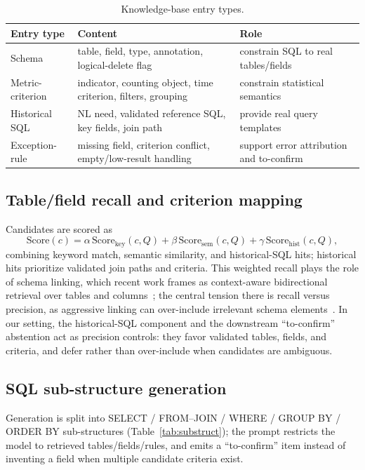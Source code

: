 \documentclass[11pt]{article}
\begin{document}
\begin{table}[t]\centering
\caption{Knowledge-base entry types.}\label{tab:kb}
\begin{tabular}{p{3.1cm}p{6.1cm}p{4.4cm}}
\toprule
Entry type & Content & Role\\
\midrule
Schema & table, field, type, annotation, logical-delete flag & constrain SQL to real tables/fields\\
Metric-criterion & indicator, counting object, time criterion, filters, grouping & constrain statistical semantics\\
Historical SQL & NL need, validated reference SQL, key fields, join path & provide real query templates\\
Exception-rule & missing field, criterion conflict, empty/low-result handling & support error attribution and to-confirm\\
\bottomrule
\end{tabular}
\end{table}

\subsection{Table/field recall and criterion mapping}
Candidates are scored as
\begin{equation}
\text{Score}(c)=\alpha\,\text{Score}_{\text{key}}(c,Q)+\beta\,\text{Score}_{\text{sem}}(c,Q)
+\gamma\,\text{Score}_{\text{hist}}(c,Q),
\end{equation}
combining keyword match, semantic similarity, and historical-SQL hits; historical hits prioritize
validated join paths and criteria. This weighted recall plays the role of schema linking, which
recent work frames as context-aware bidirectional retrieval over tables and
columns~\cite{schemalink2025}; the central tension there is recall versus precision, as aggressive
linking can over-include irrelevant schema elements~\cite{rslsql2024}. In our setting, the
historical-SQL component and the downstream ``to-confirm'' abstention act as precision controls:
they favor validated tables, fields, and criteria, and defer rather than over-include when
candidates are ambiguous.

\subsection{SQL sub-structure generation}
Generation is split into SELECT / FROM--JOIN / WHERE / GROUP BY / ORDER BY sub-structures
(Table~\ref{tab:substruct}); the prompt restricts the model to retrieved tables/fields/rules, and
emits a ``to-confirm'' item instead of inventing a field when multiple candidate criteria exist.
\end{document}
